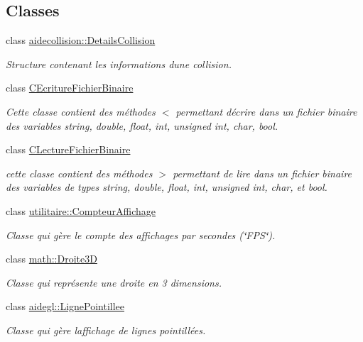 \subsection*{Classes}
\begin{DoxyCompactItemize}
\item 
class \hyperlink{classaidecollision_1_1_details_collision}{aidecollision\+::\+Details\+Collision}
\begin{DoxyCompactList}\small\item\em Structure contenant les informations d\textquotesingle{}une collision. \end{DoxyCompactList}\item 
class \hyperlink{class_c_ecriture_fichier_binaire}{C\+Ecriture\+Fichier\+Binaire}
\begin{DoxyCompactList}\small\item\em Cette classe contient des méthodes $<$ permettant d\textquotesingle{}écrire dans un fichier binaire des variables string, double, float, int, unsigned int, char, bool. \end{DoxyCompactList}\item 
class \hyperlink{class_c_lecture_fichier_binaire}{C\+Lecture\+Fichier\+Binaire}
\begin{DoxyCompactList}\small\item\em cette classe contient des méthodes $>$ permettant de lire dans un fichier binaire des variables de types string, double, float, int, unsigned int, char, et bool. \end{DoxyCompactList}\item 
class \hyperlink{classutilitaire_1_1_compteur_affichage}{utilitaire\+::\+Compteur\+Affichage}
\begin{DoxyCompactList}\small\item\em Classe qui gère le compte des affichages par secondes (\char`\"{}\+F\+P\+S\char`\"{}). \end{DoxyCompactList}\item 
class \hyperlink{classmath_1_1_droite3_d}{math\+::\+Droite3\+D}
\begin{DoxyCompactList}\small\item\em Classe qui représente une droite en 3 dimensions. \end{DoxyCompactList}\item 
class \hyperlink{classaidegl_1_1_ligne_pointillee}{aidegl\+::\+Ligne\+Pointillee}
\begin{DoxyCompactList}\small\item\em Classe qui gère l\textquotesingle{}affichage de lignes pointillées. \end{DoxyCompactList}\item 

\end{DoxyCompactItemize}
